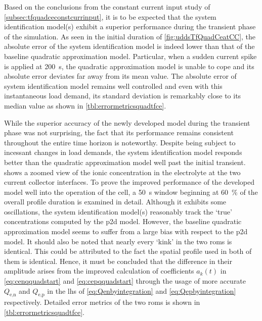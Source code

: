 Based   on   the   conclusions   from   the   constant   current   input   study
of \cref{subsec:tfquadceconstcurrinput},  it   is  to   be  expected   that  the
system  identification  model(s)  exhibit  a  superior  performance  during  the
transient  phase   of  the   simulation.  As  seen   in  the   initial  duration
of \cref{fig:uddsTfQuadCeatCC}, the absolute error  of the system identification
model is indeed  lower than that of the baseline  quadratic approximation model.
Particular, when a sudden current spike is applied at \approx \SI{200}{\second},
the  quadratic approximation  model is  unable to  cope and  its absolute  error
deviates  far  away   from  its  mean  value.  The  absolute   error  of  system
identification model  remains well controlled  and even with  this instantaneous
load demand, its standard deviation is remarkably close to its median value as
shown in \cref{tbl:errormetricsquadtfce}.



While the  superior accuracy of the  newly developed model during  the transient
phase  was not  surprising, the  fact  that its  performance remains  consistent
throughout  the  entire  time  horizon  is  noteworthy.  Despite  being  subject
to  incessant  changes   in  load  demands,  the   system  identification  model
responds better  than the  quadratic approximation model  well past  the initial
transient.   shows  a  zoomed  view of  the
ionic concentration in the electrolyte  at the two current collector interfaces.
To prove the improved performance of the developed model well into the operation
of the cell, a \SI{50}{\second} window beginning at \approx \SI{60}{\percent} of
the overall  profile duration is examined  in detail. Although it  exhibits some
oscillations,  the system  identification model(s)  reasonably track  the `true'
concentrations computed by the \gls{p2d}  model. However, the baseline quadratic
approximation  model seems  to suffer  from  a large  bias with  respect to  the
\gls{p2d} model.  It should also  be noted that nearly  every `kink' in  the two
\glspl{rom}  is identical.  This could  be attributed  to the  fact the  spatial
profile  used  in  both of  them  is  identical.  Hence,  it must  be  concluded
that  the difference  in their  amplitude arises  from the  improved calculation
of coefficients  $a_k(t)$ in \cref{eq:cenqquadstart} and \cref{eq:cepqquadstart}
through  the  usage  of  more  accurate  $Q_{\text{e,n}}$  and  $Q_{\text{e,p}}$
in  the  \gls{lhs} of \cref{eq:Qenbyintegration}  and \cref{eq:Qepbyintegration}
respectively.  Detailed   error  metrics  of   the  two  \glspl{rom}   is  shown
in \cref{tbl:errormetricsquadtfce}.

